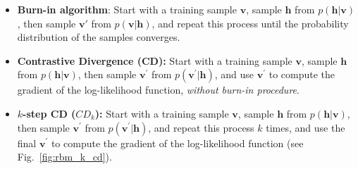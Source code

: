\documentclass[10pt, a4paper]{article}
\begin{document}
\begin{itemize}
  \item \textbf{Burn-in algorithm}: Start with a training sample $\mathbf{v}$,
    sample $\mathbf{h}$ from $p(\mathbf{h}|\mathbf{v})$,
    then sample $\mathbf{v'}$ from $p(\mathbf{v}|\mathbf{h})$,
    and repeat this process until the probability distribution of the samples converges.
  \item \textbf{Contrastive Divergence (CD):} Start with a training sample $\mathbf{v}$,
    sample $\mathbf{h}$ from $p(\mathbf{h}|\mathbf{v})$,
    then sample $\mathbf{v}^\prime$ from $p(\mathbf{v}^\prime|\mathbf{h})$,
    and use $\mathbf{v}^\prime$ to compute the gradient of the
    log-likelihood function, \textit{without burn-in procedure}.
  \item \textbf{$k$-step CD ($CD_k$):} Start with a training sample $\mathbf{v}$,
    sample $\mathbf{h}$ from $p(\mathbf{h}|\mathbf{v})$,
    then sample $\mathbf{v}^\prime$ from $p(\mathbf{v}^\prime|\mathbf{h})$,
    and repeat this process $k$ times,
    and use the final $\mathbf{v}^\prime$ to compute
    the gradient of the log-likelihood function (see Fig.~\ref{fig:rbm_k_cd}).
\end{itemize}
\end{document}
